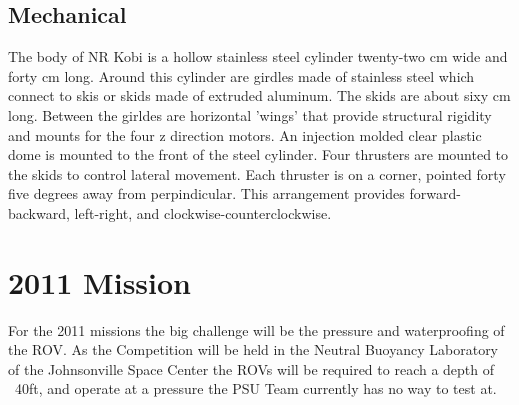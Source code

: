\documentclass{proposalnsf}
\begin{document}
\subsection{Mechanical}
The body of NR Kobi is a hollow stainless steel cylinder twenty-two cm  wide and forty cm long. Around this cylinder are girdles made of stainless steel which connect to skis or skids made of extruded aluminum. The skids are about sixy cm long. Between the girldes are horizontal 'wings' that provide structural rigidity and mounts for the four z direction motors. An injection molded clear plastic dome is mounted to the front of the steel cylinder. Four thrusters are mounted to the skids to control lateral movement. Each thruster is on a corner, pointed forty five degrees away from perpindicular. This arrangement provides forward-backward, left-right, and clockwise-counterclockwise. 

\newpage

\section{2011 Mission}
For the 2011 missions the big challenge will be the pressure and waterproofing of the ROV.  As the Competition will be held in the Neutral Buoyancy Laboratory of the Johnsonville Space Center
the ROVs will be required to reach a depth of ~40ft, and operate at a pressure the PSU Team currently has no way to test at.
\end{document}
